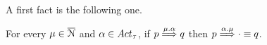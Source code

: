 A first fact is the following one.
\begin{lemma}%
  \label{lem:weak-output-swap}
  For every $\mu \in \overline{\mathcal{N}}$ and $\alpha \in \Acttau$,
  if $p \mathrel{\overset{\mu.\alpha} \Longrightarrow} q$
  then $p \mathrel{\overset{\alpha.\mu} \Longrightarrow} \cdot \equiv q$.
\end{lemma}









